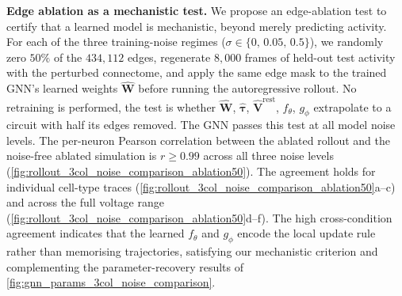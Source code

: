 \documentclass{article}
\begin{document}
\textbf{Edge ablation as a mechanistic test.}
We propose an edge-ablation test to certify that a learned model is
mechanistic, beyond merely predicting activity. For each of the three training-noise regimes ($\sigma \in \{0,\,0.05,\,0.5\}$), we randomly zero $50\%$ of the
$434{,}112$ edges, regenerate $8{,}000$ frames of held-out test
activity with the perturbed connectome, and apply the same edge mask
to the trained GNN's learned weights $\hat{\mathbf{W}}$ before
running the autoregressive rollout. No retraining is performed, the
test is whether $\hat{\mathbf{W}}$, $\hat{\boldsymbol{\tau}}$,
$\hat{\mathbf{V}}^{\mathrm{rest}}$, $f_\theta$, $g_\phi$
extrapolate to a circuit with half its edges removed. The GNN passes this test at all model noise levels. The per-neuron Pearson correlation between the ablated rollout and the noise-free ablated simulation is $r \geq 0.99$ across all three noise levels
(\cref{fig:rollout_3col_noise_comparison_ablation50}). The
agreement holds for individual cell-type traces (\cref{fig:rollout_3col_noise_comparison_ablation50}a--c) and
across the full voltage range (\cref{fig:rollout_3col_noise_comparison_ablation50}d--f). The high cross-condition
agreement indicates that the learned $f_\theta$ and $g_\phi$ encode
the local update rule rather than memorising trajectories, satisfying
our mechanistic criterion and complementing the parameter-recovery
results of \cref{fig:gnn_params_3col_noise_comparison}.
\end{document}
